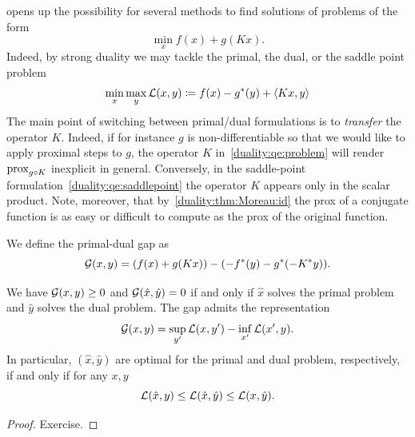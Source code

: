  opens up the possibility for several methods to find solutions of problems of the form
\begin{equation}\label{duality:qe:problem}
    \min_x f(x) + g(Kx).
\end{equation}
Indeed, by strong duality we may tackle the primal, the dual, or the saddle point problem
\begin{equation}\label{duality:qe:saddlepoint}
    \min_x \max_y \mathcal{L}(x,y)\coloneqq f(x) -g^*(y) + \left\langle Kx , y\right\rangle
\end{equation}
The main point of switching between primal/dual formulations is to \emph{transfer} the operator $K$. Indeed, if for instance $g$ is non-differentiable so that we would like to apply proximal steps to $g$, the operator $K$ in~\eqref{duality:qe:problem} will render $\mathrm{prox}_{g\circ K}$ inexplicit in general. Conversely, in the saddle-point formulation~\eqref{duality:qe:saddlepoint} the operator $K$ appears only in the scalar product. Note, moreover, that by~\cref{duality:thm:Moreau:id} the prox of a conjugate function is as easy or difficult to compute as the prox of the original function.

We define the primal-dual gap as
\begin{equation}
    \mathcal{G}(x,y) = (f(x) + g(Kx)) - (-f^*(y) - g^*(-K^*y)).
\end{equation}

\begin{lemma}
    We have $\mathcal{G}(x,y)\geq 0$ and $\mathcal{G}(\hat x,\hat y) = 0$ if and only if $\hat x$ solves the primal problem and $\hat y$ solves the dual problem. The gap admits the representation
    \begin{equation}
        \mathcal{G}(x,y) = \sup_{y'}\mathcal{L}(x,y') - \inf_{x'}\mathcal{L}(x',y).
    \end{equation}
    In particular, $(\hat x,\hat y)$ are optimal for the primal and dual problem, respectively, if and only if for any $x,y$
    \begin{equation}
        \mathcal{L}(\hat x,y)\leq \mathcal{L}(\hat x,\hat y)\leq \mathcal{L}(x,\hat y).
    \end{equation}
\end{lemma}
\begin{proof}
    Exercise.
\end{proof}

